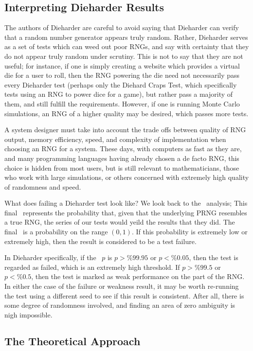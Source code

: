 \subsection{Interpreting Dieharder Results}
The authors of Dieharder are careful to avoid saying that Dieharder can verify that a random number generator appears truly random. Rather, Dieharder serves as a set of tests which can weed out poor RNGs, and say with certainty that they do not appear truly random under scrutiny. This is not to say that they are not useful; for instance, if one is simply creating a website which provides a virtual die for a user to roll, then the RNG powering the die need not necessarily pass every Dieharder test (perhaps only the Diehard Craps Test, which specifically tests using an RNG to power dice for a game), but rather pass a majority of them, and still fulfill the requirements. However, if one is running Monte Carlo simulations, an RNG of a higher quality may be desired, which passes more tests.

A system designer must take into account the trade offs between quality of RNG output, memory efficiency, speed, and complexity of implementation when choosing an RNG for a system. These days, with computers as fast as they are, and many programming languages having already chosen a de facto RNG, this choice is hidden from most users, but is still relevant to mathematicians, those who work with large simulations, or others concerned with extremely high quality of randomness and speed.

What does failing a Dieharder test look like? We look back to the \pvalue~analysis; This final \pvalue~represents the probability that, given that the underlying PRNG resembles a true RNG, the series of our tests would yeild the results that they did. The final \pvalue~is a probability on the range $(0,1)$. If this probability is extremely low or extremely high, then the result is considered to be a test failure.

In Dieharder specifically, if the \pvalue~$p$ is $p > \%99.95$ or $p < \%0.05$, then the test is regarded as failed, which is an extremely high threshold. If $p > \%99.5$ or $p < \%0.5$, then the test is marked as weak performance on the part of the RNG. In either the case of the failure or weakness result, it may be worth re-running the test using a different seed to see if this result is consistent. After all, there is some degree of randomness involved, and finding an area of zero ambiguity is nigh impossible.

\subsection{The Theoretical Approach}
\label{sec:theoretical}

